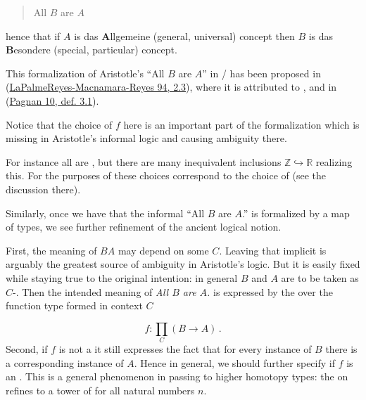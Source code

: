 \documentclass[12pt,titlepage]{article}
\theoremstyle{plain}
\theoremstyle{definition}
\theoremstyle{remark}
\begin{document}
\begin{quote}%
All $B$ are $A$


\end{quote}
hence that if $A$ is das \textbf{A}llgemeine (general, universal) concept then $B$ is das \textbf{B}esondere (special, particular) concept.

This formalization of Aristotle's ``All $B$ are $A$'' in / has been proposed in (\hyperlink{PalmeReyesMacnamaraReyes94}{LaPalmeReyes-Macnamara-Reyes 94, 2.3}), where it is attributed to , and in (\hyperlink{Pagnan10}{Pagnan 10, def. 3.1}).

Notice that the choice of $f$ here is an important part of the formalization which is missing in Aristotle's informal logic and causing ambiguity there.

For instance all  are , but there are many inequivalent  inclusions $\mathbb{Z}\hookrightarrow \mathbb{R}$ realizing this. For the purposes of  these choices correspond to the choice of  (see the discussion there).

Similarly, once we have that the informal ``All $B$ are $A$.'' is formalized by a map of types, we see further refinement of the ancient logical notion.

First, the meaning of $BA$ may depend on some  $C$. Leaving that implicit is arguably the greatest source of ambiguity in Aristotle's logic. But it is easily fixed while staying true to the original intention: in general $B$ and $A$ are to be taken as $C$-. Then the intended meaning of \emph{All $B$ are $A$.} is expressed by the  over the function type formed in context $C$

\begin{displaymath}
f\colon \underset{C}{\prod} (B \longrightarrow A)
  \,.
\end{displaymath}
Second, if $f$ is not a  it still expresses the fact that for every instance of $B$ there is a corresponding instance of $A$. Hence in general, we should further specify if $f$ is an . This is a general phenomenon in passing to higher homotopy types: the  on  refines to a tower of  for all natural numbers $n$.
\end{document}
